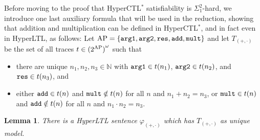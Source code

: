 \documentclass[dvipsnames,10pt,a4paper]{amsart}
\newtheorem{lem}[thm]{Lemma}
\theoremstyle{definition}
\theoremstyle{remark}
\newcommand{\nats}{\mathbb{N}}
\newcommand{\hyltl}{{HyperLTL}\xspace}
\newcommand{\hyctlstar}{{HyperCTL$^*$}\xspace}
\newcommand\AP{\textup{AP}}
\newcommand\argl{\textup{\texttt{arg1}}}
\newcommand\argr{\textup{\texttt{arg2}}}
\newcommand\res{\textup{\texttt{res}}}
\newcommand\add{\textup{\texttt{add}}}
\newcommand\mult{\textup{\texttt{mult}}}
\newcommand\phiop{\varphi_{({+},{\cdot})}}
\newcommand\Top{T_{({+},{\cdot})}}
\begin{document}
Before moving to the proof that \hyctlstar satisfiability is $\Sigma^2_1$-hard,
we introduce one last auxiliary formula that will be used in the reduction,
showing that addition and multiplication can be defined in \hyctlstar,
and in fact even in \hyltl, as follows:
  Let $\AP = \{\argl,\argr,\res,\add,\mult\}$ and let $\Top$ be the set of all traces $t \in {(2^{\AP})}^\omega$ such that 
  \begin{itemize}
  \item there are unique $n_1,n_2,n_3 \in \nats$ with $\argl \in t(n_1)$,
    $\argr \in t(n_2)$, and $\res \in t(n_3)$, and
  \item either $\add \in t(n)$ and $\mult \notin t(n)$  for all $n$ and $n_1+n_2 = n_3$,
    or $\mult \in t(n)$ and $\add \notin t(n)$  for all $n$ and $n_1 \cdot n_2 = n_3$.
  \end{itemize}

\begin{lem}\label{lem:phiop}
  There is a \hyltl sentence $\phiop$ which has $\Top$ as unique model.
\end{lem}
\end{document}
